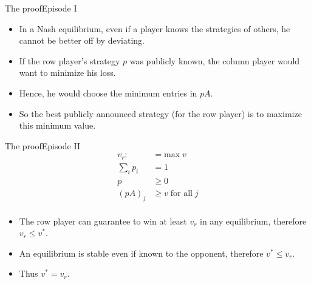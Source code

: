 \documentclass{beamer}
\begin{document}
\begin{frame}{The proof}{Episode I}
  \begin{itemize}
    \item In a Nash equilibrium, even if a player knows the strategies of
      others, he cannot be better off by deviating.
      \pause
    \item If the row player's strategy $p$ was publicly known, the column
      player would want to minimize his loss.
      \pause
    \item Hence, he would choose the minimum entries in $pA$.
      \pause
    \item So the best publicly announced strategy (for the row player) is to
      maximize this minimum value.
      \pause
  \end{itemize}
\end{frame}

\begin{frame}{The proof}{Episode II}
  \begin{align*}
    v_r :&= \textrm{max} \; v \\
    \sum_{i} p_i &= 1 \\
    p &\geq 0 \\
    (pA)_j &\geq v \; \textrm{for all} \; j\\
  \end{align*}
    \pause
  \begin{itemize}
    \item The row player can guarantee to win at least $v_r$ in any
      equilibrium, therefore $v_r \leq v^*$.
    \pause
    \item An equilibrium is stable even if known to the opponent, therefore
      $v^* \leq v_r$.
    \pause
    \item Thus $v^* = v_r$.
  \end{itemize}
\end{frame}

\end{document}
